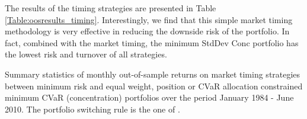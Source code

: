 \documentclass[12pt,a4paper]{article}
\begin{document}
 The results of the timing strategies are presented in Table \ref{Table:oosresults_timing}. 
Interestingly, we find that this simple market timing methodology is very effective in reducing the downside risk of the portfolio. 
 In fact, combined with the market timing, the minimum StdDev Conc portfolio has the lowest risk and turnover of all strategies.
  
  
 


\begin{landscape}
\begin{table}[tb]
\begin{center}

\caption{Summary statistics of monthly out-of-sample returns on market timing strategies between
minimum risk and equal weight, position or CVaR allocation constrained minimum CVaR (concentration) portfolios over the period January 1984 - June 2010. The portfolio switching rule is the one of \citet{Faber2007}. \label{Table:oosresults_timing}    } \vspace{-0.5cm}


\end{center}
\end{table}
\end{landscape}
\end{document}
